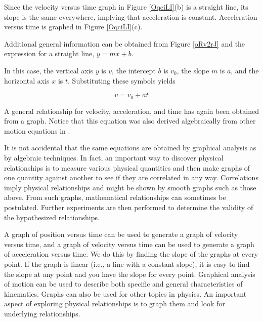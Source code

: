\documentclass[main-ap-physics.tex]{subfiles}
\begin{document}
Since the velocity versus time graph in Figure \ref{OqciLI}(b) is a straight line, its slope is the same everywhere, implying that acceleration is constant. Acceleration versus time is graphed in Figure \ref{OqciLI}(c).

\vspace{1em}

Additional general information can be obtained from Figure \ref{oRv2rJ} and the expression for a straight line, $y = mx + b$.

\vspace{1em}

In this case, the vertical axis $y$ is $v$, the intercept $b$ is $v_0$, the slope $m$ is $a$, and the horizontal axis $x$ is $t$. Substituting these symbols yields

\begin{equation}
    v = v_0 + at
\end{equation}

A general relationship for velocity, acceleration, and time has again been obtained from a graph. Notice that this equation was also derived algebraically from other motion equations in .

\vspace{1em}

It is not accidental that the same equations are obtained by graphical analysis as by algebraic techniques. In fact, an important way to discover physical relationships is to measure various physical quantities and then make graphs of one quantity against another to see if they are correlated in any way. Correlations imply physical relationships and might be shown by smooth graphs such as those above. From such graphs, mathematical relationships can sometimes be postulated. Further experiments are then performed to determine the validity of the hypothesized relationships.



A graph of position versus time can be used to generate a graph of velocity versus time, and a graph of velocity versus time can be used to generate a graph of acceleration versus time. We do this by finding the slope of the graphs at every point. If the graph is linear (i.e., a line with a constant slope), it is easy to find the slope at any point and you have the slope for every point. Graphical analysis of motion can be used to describe both specific and general characteristics of kinematics. Graphs can also be used for other topics in physics. An important aspect of exploring physical relationships is to graph them and look for underlying relationships.
\end{document}

